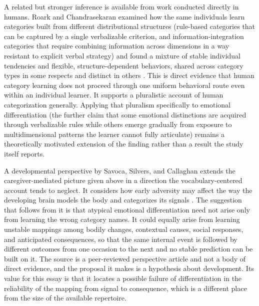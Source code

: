 \documentclass[11pt]{article}
\begin{document}
A related but stronger inference is available from work conducted directly in humans. Roark and Chandrasekaran examined how the same individuals learn categories built from different distributional structures (rule-based categories that can be captured by a single verbalizable criterion, and information-integration categories that require combining information across dimensions in a way resistant to explicit verbal strategy) and found a mixture of stable individual tendencies and flexible, structure-dependent behaviors, shared across category types in some respects and distinct in others \citep{Roark2023}. This is direct evidence that human category learning does not proceed through one uniform behavioral route even within an individual learner. It supports a pluralistic account of human categorization generally. Applying that pluralism specifically to emotional differentiation (the further claim that some emotional distinctions are acquired through verbalizable rules while others emerge gradually from exposure to multidimensional patterns the learner cannot fully articulate) remains a theoretically motivated extension of the finding rather than a result the study itself reports.

A developmental perspective by Savoca, Silvers, and Callaghan extends the caregiver-mediated picture given above in a direction the vocabulary-centered account tends to neglect. It considers how early adversity may affect the way the developing brain models the body and categorizes its signals \citep{Savoca2026}. The suggestion that follows from it is that atypical emotional differentiation need not arise only from learning the wrong category names. It could equally arise from learning unstable mappings among bodily changes, contextual causes, social responses, and anticipated consequences, so that the same internal event is followed by different outcomes from one occasion to the next and no stable prediction can be built on it. The source is a peer-reviewed perspective article and not a body of direct evidence, and the proposal it makes is a hypothesis about development. Its value for this essay is that it locates a possible failure of differentiation in the reliability of the mapping from signal to consequence, which is a different place from the size of the available repertoire.
\end{document}
